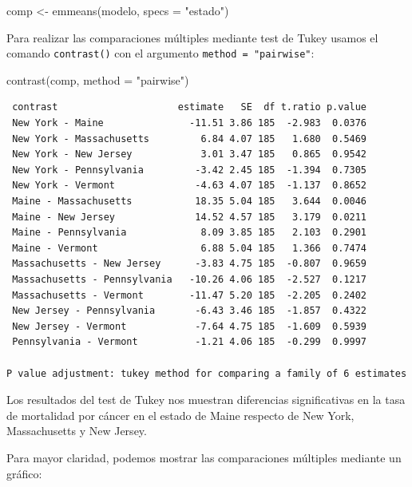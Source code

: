 \documentclass[
  spanish,
  a4paper,
]{scrbook}
\newenvironment{Shaded}{\begin{snugshade}}{\end{snugshade}}
\newcommand{\AttributeTok}[1]{\textcolor[rgb]{0.40,0.45,0.13}{#1}}
\newcommand{\FunctionTok}[1]{\textcolor[rgb]{0.28,0.35,0.67}{#1}}
\newcommand{\NormalTok}[1]{\textcolor[rgb]{0.00,0.23,0.31}{#1}}
\newcommand{\OtherTok}[1]{\textcolor[rgb]{0.00,0.23,0.31}{#1}}
\newcommand{\StringTok}[1]{\textcolor[rgb]{0.13,0.47,0.30}{#1}}
\begin{document}
\begin{Shaded}
\begin{Highlighting}[]
\NormalTok{comp }\OtherTok{\textless{}{-}} \FunctionTok{emmeans}\NormalTok{(modelo, }\AttributeTok{specs =} \StringTok{"estado"}\NormalTok{)}
\end{Highlighting}
\end{Shaded}

Para realizar las comparaciones múltiples mediante test de Tukey usamos
el comando \texttt{contrast()} con el argumento
\texttt{method\ =\ "pairwise"}:

\begin{Shaded}
\begin{Highlighting}[]
\FunctionTok{contrast}\NormalTok{(comp, }\AttributeTok{method =} \StringTok{"pairwise"}\NormalTok{)}
\end{Highlighting}
\end{Shaded}

\begin{verbatim}
 contrast                     estimate   SE  df t.ratio p.value
 New York - Maine               -11.51 3.86 185  -2.983  0.0376
 New York - Massachusetts         6.84 4.07 185   1.680  0.5469
 New York - New Jersey            3.01 3.47 185   0.865  0.9542
 New York - Pennsylvania         -3.42 2.45 185  -1.394  0.7305
 New York - Vermont              -4.63 4.07 185  -1.137  0.8652
 Maine - Massachusetts           18.35 5.04 185   3.644  0.0046
 Maine - New Jersey              14.52 4.57 185   3.179  0.0211
 Maine - Pennsylvania             8.09 3.85 185   2.103  0.2901
 Maine - Vermont                  6.88 5.04 185   1.366  0.7474
 Massachusetts - New Jersey      -3.83 4.75 185  -0.807  0.9659
 Massachusetts - Pennsylvania   -10.26 4.06 185  -2.527  0.1217
 Massachusetts - Vermont        -11.47 5.20 185  -2.205  0.2402
 New Jersey - Pennsylvania       -6.43 3.46 185  -1.857  0.4322
 New Jersey - Vermont            -7.64 4.75 185  -1.609  0.5939
 Pennsylvania - Vermont          -1.21 4.06 185  -0.299  0.9997

P value adjustment: tukey method for comparing a family of 6 estimates 
\end{verbatim}

Los resultados del test de Tukey nos muestran diferencias significativas
en la tasa de mortalidad por cáncer en el estado de Maine respecto de
New York, Massachusetts y New Jersey.

Para mayor claridad, podemos mostrar las comparaciones múltiples
mediante un gráfico:
\end{document}
